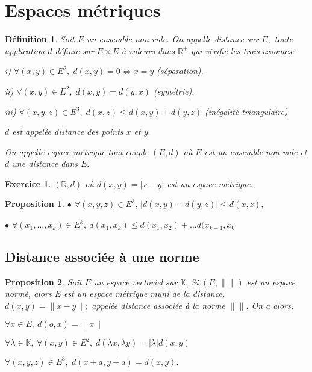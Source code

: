 \documentclass[11pt,a4paper]{report}
\newtheorem{definition}{Définition}[section]
\newtheorem{proposition}{Proposition}[section]
\newtheorem{exo}{Exercice}[section]
\begin{document}
\section{Espaces métriques}
\begin{definition}
Soit $E$ un ensemble non vide. On appelle distance sur $E,$ toute application $d$ définie sur $E\times E$ à valeurs dans $\mathbb{R}^+$ qui vérifie les trois axiomes:

i) $\forall(x,y)\in E^2,\;d(x,y)=0\Leftrightarrow x=y$ (séparation).

ii) $\forall(x,y)\in E^2,\; d(x,y)=d(y,x)$  (symétrie).

iii) $\forall(x,y,z)\in E^3,\;d(x,z)\leq d(x,y)+d(y,z) $ (inégalité triangulaire)

$d$ est appelée distance des points $x$ et $y.$

On appelle espace métrique tout couple $(E,d)$ où $E$ est un ensemble non vide et $d$ une distance dans $E.$
\end{definition}

\begin{exo}
$(\mathbb{R},d)$ où $d(x,y)=|x-y|$ est un espace métrique.
\end{exo}
\begin{proposition}

$\bullet$ $\forall (x,y,z)\in E^3,\,|d(x,y)-d(y,z)|\leq d(x,z),$

$\bullet$ $\forall(x_1,...,x_k)\in E^k,\:d(x_1,x_k)\leq d(x_1,x_2)+...d(x_{k-1},x_k$
\end{proposition}

\subsection{Distance associée à une norme}




\begin{proposition}

Soit $E$ un espace vectoriel sur $\mathbb{K}.$ Si $(E,\|\|)$ est un espace normé, alors $E$ est un espace métrique muni de la distance, $d(x,y)=\|x-y\|;$ appelée distance associée à la norme $\|\|.$ On a alors,

$\forall x\in E,\:d(o,x)=\|x\|$

$\forall\lambda\in \mathbb{K},\:\forall(x,y)\in E^2,\;d(\lambda x,\lambda y)=|\lambda|d(x,y)$

$\forall(x,y,z)\in E^3,\;d(x+a,y+a)=d(x,y).$
\end{proposition}
\end{document}
